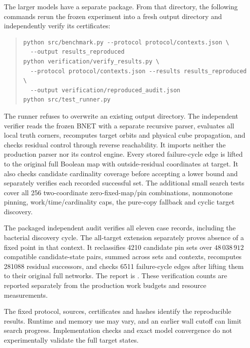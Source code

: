 The larger models have a separate  package.
From that directory, the following commands rerun the frozen experiment
into a fresh output directory and independently verify its certificates:
\begin{quote}\small
\begin{verbatim}
python src/benchmark.py --protocol protocol/contexts.json \
  --output results_reproduced
python verification/verify_results.py \
  --protocol protocol/contexts.json --results results_reproduced \
  --output verification/reproduced_audit.json
python src/test_runner.py
\end{verbatim}
\end{quote}
The runner refuses to overwrite an existing output directory. The
independent verifier reads the frozen BNET with a separate recursive
parser, evaluates all local truth corners, recomputes target orbits and
physical cube propagation, and checks residual control through reverse
reachability. It imports neither the production parser nor its control
engine. Every stored failure-cycle edge is lifted to the original full
Boolean map with outside-residual coordinates at target. It also checks
candidate cardinality coverage before accepting a lower bound and
separately verifies each recorded successful set. The additional small
search tests cover all 256 two-coordinate zero-fixed-map/pin combinations,
nonmonotone pinning, work/time/cardinality caps, the pure-copy fallback
and cyclic target discovery.

The packaged independent audit verifies all eleven case records, including
the bacterial discovery cycle. The all-target extension separately proves absence of a fixed point in that context. It reclassifies 4210 candidate pin sets
over $48\,038\,912$ compatible candidate-state pairs, summed across
sets and contexts, recomputes 281088
residual successors, and checks 6511 failure-cycle edges after lifting
them to their original full networks. The report is
. These
verification counts are reported separately from the production work
budgets and resource measurements.

\begin{samepage}
The fixed protocol, sources, certificates and hashes identify the
reproducible results. Runtime and memory use may vary, and an earlier wall
cutoff can limit search progress. Implementation checks and exact model
convergence do not experimentally validate the full target states.\par
\end{samepage}


